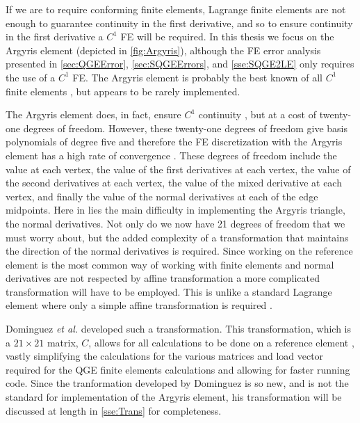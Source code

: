 If we are to require conforming finite elements, Lagrange finite elements are
not enough to guarantee continuity in the first derivative, and so to ensure
continuity in the first derivative \cite{Johnson} a $C^1$ FE will be required.
In this thesis we focus on the Argyris element (depicted in
\autoref{fig:Argyris}), although the FE error analysis presented in
\autoref{sec:QGEError}, \autoref{sec:SQGEErrors}, and \autoref{sse:SQGE2LE} only
requires the use of a $C^1$ FE. The Argyris element is probably the best known
of all $C^1$ finite elements \cite{Argyris,Dominguez08}, but appears to be rarely
implemented.



The Argyris element does, in fact, ensure $C^1$ continuity
\cite{Dominguez08,Okabe}, but at a cost of twenty-one degrees of freedom.
However, these twenty-one degrees of freedom give basis polynomials of degree
five and therefore the FE discretization with the Argyris element has a high
rate of convergence \cite{Dominguez08}.  These degrees of freedom include the
value at each vertex, the value of the first derivatives at each vertex, the
value of the second derivatives at each vertex, the value of the mixed
derivative at each vertex, and finally the value of the normal derivatives at
each of the edge midpoints. Here in lies the main difficulty in implementing the
Argyris triangle, the normal derivatives. Not only do we now have 21 degrees of
freedom that we must worry about, but the added complexity of a transformation
that maintains the direction of the normal derivatives is required. Since
working on the reference element is the most common way of working with finite
elements and normal derivatives are not respected by affine transformation a
more complicated transformation will have to be employed. This is unlike a
standard Lagrange element where only a simple affine transformation is required
\cite{Dominguez08}.

Dominguez \emph{et al.} developed such a transformation. This transformation,
which is a $21 \times 21$ matrix, $C$, allows for all calculations to be done on
a reference element \cite{Dominguez08}, vastly simplifying the calculations for
the various matrices and load vector required for the QGE finite elements
calculations and allowing for faster running code. Since the tranformation
developed by Dominguez is so new, and is not the standard for implementation of
the Argyris element, his transformation will be discussed at length in
\autoref{sse:Trans} for completeness.
